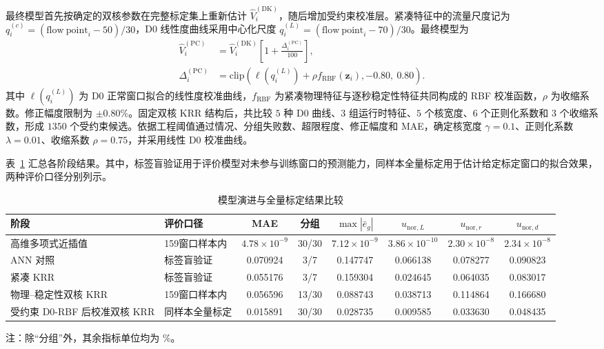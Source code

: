 最终模型首先按确定的双核参数在完整标定集上重新估计 $\hat V_i^{(\mathrm{DK})}$，随后增加受约束校准层。紧凑特征中的流量尺度记为 $q_i^{(c)}=(\mathrm{flow\ point}_i-50)/30$，D0 线性度曲线采用中心化尺度 $q_i^{(L)}=(\mathrm{flow\ point}_i-70)/30$。最终模型为
\begin{equation}
\begin{aligned}
\hat V_i^{(\mathrm{PC})}
&=\hat V_i^{(\mathrm{DK})}
\left[1+\frac{\Delta_i^{(\mathrm{PC})}}{100}\right],\\
\Delta_i^{(\mathrm{PC})}
&=\mathrm{clip}\left(
\ell(q_i^{(L)})+\rho f_{\mathrm{RBF}}(\boldsymbol z_i),
-0.80,\ 0.80
\right).
\end{aligned}
\label{eq:postcalibrated_dual_kernel_model}
\end{equation}
其中 $\ell(q_i^{(L)})$ 为 D0 正常窗口拟合的线性度校准曲线，$f_{\mathrm{RBF}}$ 为紧凑物理特征与逐秒稳定性特征共同构成的 RBF 校准函数，$\rho$ 为收缩系数。修正幅度限制为 $\pm0.80\%$。固定双核 KRR 结构后，共比较 $5$ 种 D0 曲线、$3$ 组运行时特征、$5$ 个核宽度、$6$ 个正则化系数和 $3$ 个收缩系数，形成 $1350$ 个受约束候选。依据工程阈值通过情况、分组失败数、超限程度、修正幅度和 MAE，确定核宽度 $\gamma=0.1$、正则化系数 $\lambda=0.01$、收缩系数 $\rho=0.75$，并采用线性 D0 校准曲线。

表~\ref{tab:model_evolution_postcalibrated} 汇总各阶段结果。其中，标签盲验证用于评价模型对未参与训练窗口的预测能力，同样本全量标定用于估计给定标定窗口的拟合效果，两种评价口径分别列示。

\begin{table}[H]
\centering
\caption{模型演进与全量标定结果比较}
\label{tab:model_evolution_postcalibrated}
\scriptsize
\setlength{\tabcolsep}{2.5pt}
\begin{tabular}{p{}p{}cccccc}
\toprule
阶段 & 评价口径 & MAE & 分组 & $\max|\bar e_g|$ & $u_{\mathrm{nor},L}$ & $u_{\mathrm{nor},r}$ & $u_{\mathrm{nor},d}$ \\
\midrule
高维多项式近插值 & 159窗口样本内 & $4.78\!\times\!10^{-9}$ & 30/30 & $7.12\!\times\!10^{-9}$ & $3.86\!\times\!10^{-10}$ & $2.30\!\times\!10^{-8}$ & $2.34\!\times\!10^{-8}$ \\
ANN 对照 & 标签盲验证 & 0.070924 & 3/7 & 0.147747 & 0.066138 & 0.078277 & 0.090823 \\
紧凑 KRR & 标签盲验证 & 0.055176 & 3/7 & 0.159304 & 0.024645 & 0.064035 & 0.083017 \\
物理--稳定性双核 KRR & 159窗口样本内 & 0.056596 & 13/30 & 0.088743 & 0.038713 & 0.114864 & 0.166680 \\
受约束 D0-RBF 后校准双核 KRR & 同样本全量标定 & 0.015891 & 30/30 & 0.028735 & 0.009585 & 0.033630 & 0.048435 \\
\bottomrule
\end{tabular}
\par\smallskip
{\footnotesize 注：除“分组”外，其余指标单位均为 \%。}
\end{table}

